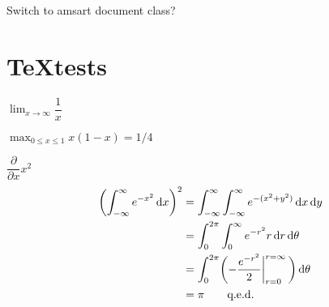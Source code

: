 \documentclass[12pt]{article}
\newcommand*\diff{\mathop{}\!\mathrm{d}}
\begin{document}
Switch to amsart document class?

\section{\TeX tests}

$\lim_{x\to\infty}\dfrac{1}{x}$

 $\max_{0\le x\le 1}x(1-x)=1/4$

$\dfrac{\partial}{\partial x} x^{2}$
\begin{align*}
\biggl(\int_{-\infty}^\infty e^{-x^2}\diff x\biggr)^2 
  &= \int_{-\infty}^\infty\int_{-\infty}^\infty e^{-(x^2+y^2)}\diff x\diff y \\
  &= \int_0^{2\pi}\int_0^\infty e^{-r^2}r\diff r\diff\theta                  \\
  &= \int_0^{2\pi}\biggl(-{e^{-r^2}\over2}\bigg\vert_{r=0}^{r=\infty}\,\biggr)\diff\theta\\
  &= \pi                                          \tag*{q.e.d.}
\end{align*}
\end{document}

